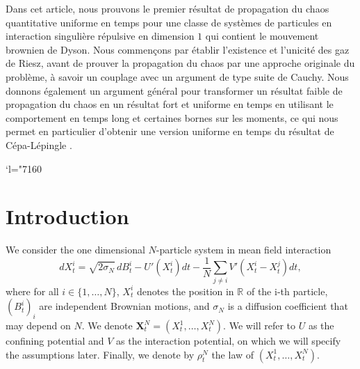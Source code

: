 \documentclass[JEP,XML,SOM,Unicode,published]{cedram}
\newcommand{\Changel}{\mathcode`l="7160}
\newcommand{\bX}{{\boldsymbol{X}}}
\theoremstyle{plain}
\theoremstyle{definition}
\begin{document}


\begin{altabstract}
Dans cet article, nous prouvons le premier résultat de propagation du chaos quantitative uniforme en temps pour une classe de systèmes de particules en interaction singulière répulsive en dimension $1$ qui contient le mouvement brownien de Dyson. Nous commençons par établir l'existence et l'unicité des gaz de Riesz, avant de prouver la propagation du chaos par une approche originale du problème, à savoir un couplage avec un argument de type suite de Cauchy. Nous donnons également un argument général pour transformer un résultat faible de propagation du chaos en un résultat fort et uniforme en temps en utilisant le comportement en temps long et certaines bornes sur les moments, ce qui nous permet en particulier d'obtenir une version uniforme en temps du résultat de Cépa-Lépingle \cite{cepa_lepingle}.
\end{altabstract}

\maketitle
\vspace*{-\baselineskip}
\tableofcontents
\mainmatter
\Changel

\section{Introduction}

We consider the one dimensional $N$-particle system in mean field interaction\vspace*{-3pt}
\begin{equation}\label{particle_system}
dX^i_t=\sqrt{2\sigma_N}\,dB^i_t-U'\left(X^i_t\right)dt-\frac{1}{N}\sum_{j\neq i}V'(X^i_t-X^j_t)dt,
\end{equation}
where for all $i\in\{1,\dots,N\}$, $X^i_t$ denotes the position in $\mathbb{R}$ of the i-th particle, $(B^i_t)_i$ are independent Brownian motions, and $\sigma_N$ is a diffusion coefficient that may depend on $N$. We denote $\bX^N_t=\left(X^1_t,\dots,X^N_t\right)$. We will refer to $U$ as the confining potential and $V$ as the interaction potential, on which we will specify the assumptions later. Finally, we denote by $\rho^N_t$ the law of $(X^1_t,\dots,X^N_t)$.
\end{document}
